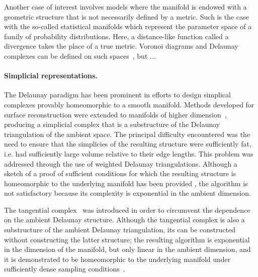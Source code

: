 Another case of interest involves models where the manifold is endowed
with a geometric structure that is not necessarily defined by a
metric. Such is the case with the so-called statistical manifolds
which represent the parameter space of a family of probability
distributions. Here, a distance-like function called a divergence
takes the place of a true metric.  Voronoi diagrams and Delaunay
complexes can be defined on such
spaces~\cite{onishi1998,boissonnat2010bregvor}, but ...

\paragraph{Simplicial representations.} 
The Delaunay paradigm has been prominent in efforts to design
simplical complexes provably homeomorphic to a smooth manifold.
Methods developed for surface reconstruction were extended to
manifolds of higher dimension~\cite{cheng2005}, producing a simplicial
complex that is a substructure of the Delaunay triangulation of the
ambient space. The principal difficulty encountered was the need to
ensure that the simplicies of the resulting structure were
sufficiently fat, i.e. had sufficiently large volume relative to their
edge lengths. This problem was addressed through the use of weighted
Delaunay triangulations. Although a sketch of a proof of sufficient
conditions for which the resulting structure is homeomorphic to the
underlying manifold has been provided \cite{cairns1961,cheng2005}, the
algorithm is not satisfactory because its complexity is exponential in
the ambient dimension.

The tangential complex~\cite{boissonnat2010tan-socg} was introduced in
order to circumvent the dependence on the ambient Delaunay
structure. Although the tangential complex is also a substructure of
the ambient Delaunay triangulation, its can be constructed without
constructing the latter structure; the resulting algorithm is
exponential in the dimension of the manifold, but only linear in the
ambient dimension, and it is demonstrated to be homeomorphic to the
underlying manifold under sufficiently dense sampling
conditions~\cite{boissonnat2011tancplx}.

